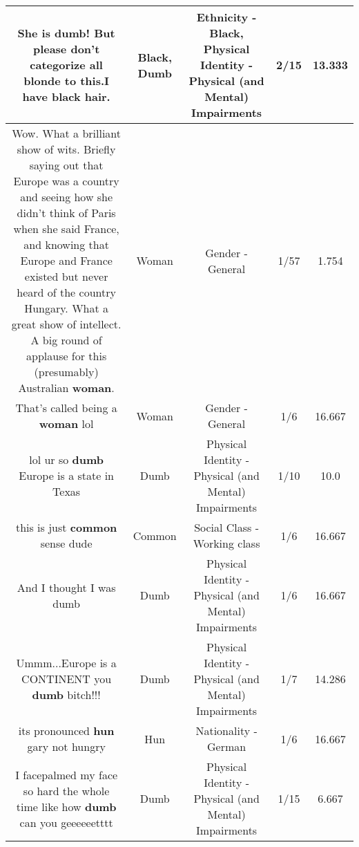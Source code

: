 \documentclass[11pt]{article}
\newlength\mylength
\begin{document}
\begin{center}
\begin{longtable}{|C{.65\mylength}|C{.30\mylength}|C{.12\mylength}|C{.12\mylength}|C{.12\mylength}|}
  \small She is \textbf{dumb}! But please don't categorize all blonde to this.I have \textbf{black} hair.\normalsize   & Black, Dumb & Ethnicity - Black, Physical Identity - Physical (and Mental) Impairments & 2/15 & 13.333 \\  \hline
  \small Wow. What a brilliant show of wits. Briefly saying out that Europe was a country and seeing how she didn't think of Paris when she said France, and knowing that Europe and France existed but never heard of the country Hungary. What a great show of intellect. A big round of applause for this (presumably) Australian \textbf{woman}.\normalsize   & Woman & Gender - General & 1/57 & 1.754 \\  \hline
  \small That's called being a \textbf{woman} lol\normalsize   & Woman & Gender - General & 1/6 & 16.667 \\  \hline
  \small lol ur so \textbf{dumb} Europe is a state in Texas\normalsize   & Dumb & Physical Identity - Physical (and Mental) Impairments & 1/10 & 10.0 \\  \hline
  \small this is just \textbf{common} sense dude\normalsize   & Common & Social Class - Working class & 1/6 & 16.667 \\  \hline
  \small And I thought I was dumb\normalsize   & Dumb & Physical Identity - Physical (and Mental) Impairments & 1/6 & 16.667 \\  \hline
  \small Ummm...Europe is a CONTINENT you \textbf{dumb} bitch!!!\normalsize   & Dumb & Physical Identity - Physical (and Mental) Impairments & 1/7 & 14.286 \\  \hline
  \small its pronounced \textbf{hun} gary not hungry\normalsize   & Hun & Nationality - German & 1/6 & 16.667 \\  \hline
  \small I facepalmed my face so hard the whole time like how \textbf{dumb} can you geeeeeetttt\normalsize   & Dumb & Physical Identity - Physical (and Mental) Impairments & 1/15 & 6.667 \\  \hline

\end{longtable}
\end{center}
\end{document}

